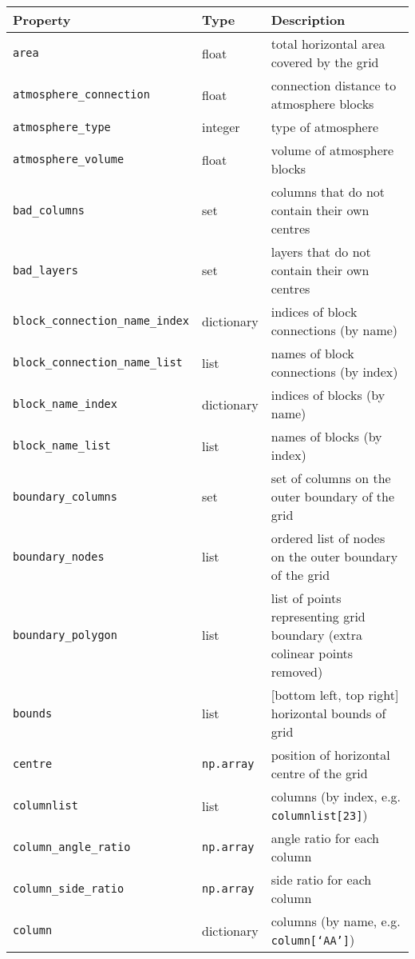 \begin{center}
  \begin{longtable}{|l|l|p{75mm}|}
    \hline
    \textbf{Property} & \textbf{Type} & \textbf{Description}\\
    \hline
    \texttt{area} & float & total horizontal area covered by the grid \\
    \texttt{atmosphere\_connection} & float & connection distance to atmosphere blocks\\
    \texttt{atmosphere\_type} & integer & type of atmosphere\\
    \texttt{atmosphere\_volume} & float & volume of atmosphere blocks\\
    \texttt{bad\_columns} & set & columns that do not contain their own centres\\
    \texttt{bad\_layers} & set & layers that do not contain their own centres\\
    \texttt{block\_connection\_name\_index} & dictionary & indices of block connections (by name)\\
    \texttt{block\_connection\_name\_list} & list & names of block connections (by index)\\
    \texttt{block\_name\_index} & dictionary & indices of blocks (by name)\\
    \texttt{block\_name\_list} & list & names of blocks (by index)\\
    \texttt{boundary\_columns} & set & set of columns on the outer boundary of the grid \\
    \texttt{boundary\_nodes} & list & ordered list of nodes on the outer boundary of the grid \\
    \texttt{boundary\_polygon} & list & list of points representing grid boundary (extra colinear points removed) \\
    \texttt{bounds} & list & [bottom left, top right] horizontal bounds of grid\\
    \texttt{centre} & \texttt{np.array} & position of horizontal centre of the grid \\
    \texttt{columnlist} & list & columns (by index, e.g. \texttt{columnlist[23]})\\
    \texttt{column\_angle\_ratio} & \texttt{np.array} & angle ratio for each column\\
    \texttt{column\_side\_ratio} & \texttt{np.array} & side ratio for each column\\
    \texttt{column} & dictionary & columns (by name, e.g. \texttt{column[`AA']})\\

\end{longtable}
\end{center}
